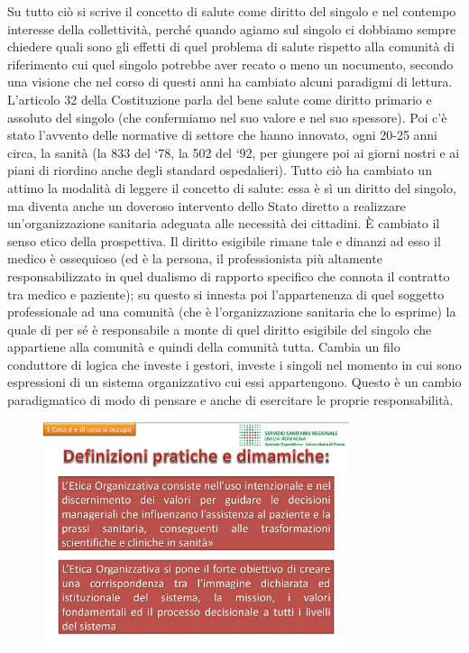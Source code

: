 Su tutto ciò si scrive il concetto di salute come diritto del singolo e
nel contempo interesse della collettività, perché quando agiamo sul
singolo ci dobbiamo sempre chiedere quali sono gli effetti di quel
problema di salute rispetto alla comunità di riferimento cui quel
singolo potrebbe aver recato o meno un nocumento, secondo una visione
che nel corso di questi anni ha cambiato alcuni paradigmi di lettura.
L'articolo 32 della Costituzione parla del bene salute come diritto
primario e assoluto del singolo (che confermiamo nel suo valore e nel
suo spessore). Poi c'è stato l'avvento delle normative di settore che
hanno innovato, ogni 20-25 anni circa, la sanità (la 833 del `78, la 502
del `92, per giungere poi ai giorni nostri e ai piani di riordino anche
degli standard ospedalieri). Tutto ciò ha cambiato un attimo la modalità
di leggere il concetto di salute: essa è sì un diritto del singolo, ma
diventa anche un doveroso intervento dello Stato diretto a realizzare
un'organizzazione sanitaria adeguata alle necessità dei cittadini. È
cambiato il senso etico della prospettiva. Il diritto esigibile rimane
tale e dinanzi ad esso il medico è ossequioso (ed è la persona, il
professionista più altamente responsabilizzato in quel dualismo di
rapporto specifico che connota il contratto tra medico e paziente); su
questo si innesta poi l'appartenenza di quel soggetto professionale ad
una comunità (che è l'organizzazione sanitaria che lo esprime) la quale
di per sé è responsabile a monte di quel diritto esigibile del singolo
che appartiene alla comunità e quindi della comunità tutta. Cambia un
filo conduttore di logica che investe i gestori, investe i singoli nel
momento in cui sono espressioni di un sistema organizzativo cui essi
appartengono. Questo è un cambio paradigmatico di modo di pensare e
anche di esercitare le proprie responsabilità.

 \begin{figure}[!ht]
\centering
	\includegraphics[width=0.8\textwidth]{32/image5.jpeg}
	\end{figure}

